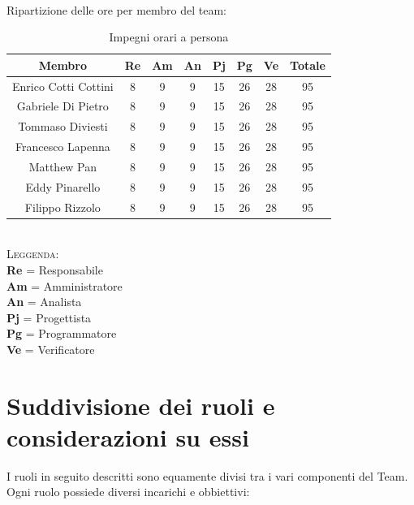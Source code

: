 \documentclass{article}
\begin{document}
\\
Ripartizione delle ore per membro del team:
\begin{table}[!h]
	\begin{center}
		\begin{tabular}{ |c|c|c|c|c|c|c|c| }
			\hline
			\textbf{Membro}    & \textbf{Re} & \textbf{Am} & \textbf{An} & \textbf{Pj} & \textbf{Pg} & \textbf{Ve} & \textbf{Totale} \\
			\hline
			Enrico Cotti Cottini     & 8           & 9           & 9          & 15          & 26          & 28          & 95              \\
			Gabriele Di Pietro       & 8           & 9           & 9          & 15          & 26          & 28          & 95              \\
			Tommaso Diviesti         & 8           & 9           & 9          & 15          & 26          & 28          & 95              \\
			Francesco Lapenna        & 8           & 9           & 9          & 15          & 26          & 28          & 95              \\
			Matthew Pan              & 8           & 9           & 9          & 15          & 26          & 28          & 95              \\
			Eddy Pinarello           & 8           & 9           & 9          & 15          & 26          & 28          & 95              \\
			Filippo Rizzolo          & 8           & 9           & 9          & 15          & 26          & 28          & 95              \\
			\hline
		\end{tabular}
        \caption{Impegni orari a persona} 
    \end{center}
\end{table}
\\
\textsc{Leggenda:} \\
    \textbf{Re} = Responsabile \\
    \textbf{Am} = Amministratore \\
    \textbf{An} = Analista \\
    \textbf{Pj} = Progettista \\
    \textbf{Pg} = Programmatore \\
    \textbf{Ve} = Verificatore \\
    
\newpage

\section{Suddivisione dei ruoli e considerazioni su essi}
I ruoli in seguito descritti sono equamente divisi tra i vari componenti del Team. Ogni ruolo possiede diversi incarichi e obbiettivi:
\end{document}
